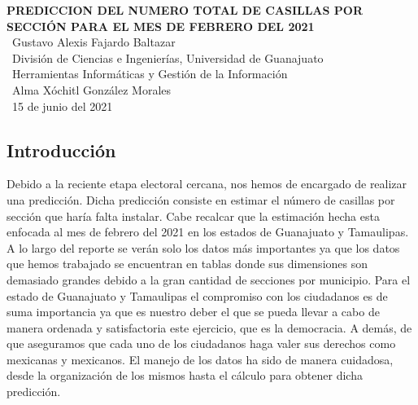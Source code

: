 \documentclass[12pt,a4paper]{report}
\author{Gustavo Alexis Fajardo Baltazar}
\begin{document}
\begin{titlepage}
\begin{center}
{\bfseries\normalsize PREDICCION DEL NUMERO TOTAL DE CASILLAS POR SECCIÓN PARA EL MES DE FEBRERO DEL 2021\\}
\vspace{1cm}
{\mdseries\ Gustavo Alexis Fajardo Baltazar\\}
\vspace{1cm}
{\mdseries\ División de Ciencias e Ingenierías, Universidad de Guanajuato \\}
\vspace{1cm}
{\mdseries\ Herramientas Informáticas y Gestión de la Información\\}
\vspace{1cm}
{\mdseries\ Alma Xóchitl González Morales \\}
\vspace{1cm}
{\mdseries\ 15 de junio del 2021}
\end{center}
\end{titlepage}

\begin{center}
\section*{Introducción}
\end{center}
Debido a la reciente etapa electoral cercana, nos hemos de encargado de realizar una predicción. Dicha predicción consiste en estimar el número de casillas por sección que haría falta instalar. Cabe recalcar que la estimación hecha esta enfocada al mes de febrero del 2021 en los estados de Guanajuato y Tamaulipas. A lo largo del reporte se verán solo los datos más importantes ya que los datos que hemos trabajado se encuentran en tablas donde sus dimensiones son demasiado grandes debido a la gran cantidad de secciones por municipio.
Para el estado de Guanajuato y Tamaulipas el compromiso con los ciudadanos es de suma importancia ya que es nuestro deber el que se pueda llevar a cabo de manera ordenada y satisfactoria este ejercicio, que es la democracia. A demás, de que aseguramos que cada uno de los ciudadanos haga valer sus derechos como mexicanas y mexicanos.
El manejo de los datos ha sido de manera cuidadosa, desde la organización de los mismos hasta el cálculo para obtener dicha predicción.


\vspace{0.5cm}
\end{document}
